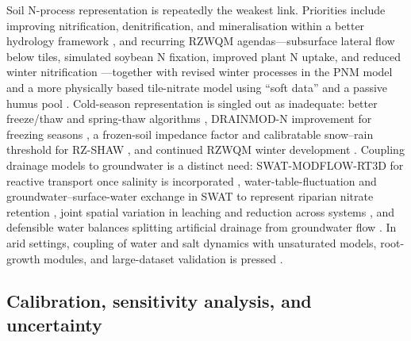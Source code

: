 \documentclass[11pt]{article}
\begin{document}
Soil N-process representation is repeatedly the weakest link. Priorities include
improving nitrification, denitrification, and mineralisation within a better
hydrology framework \parencite{Smith2020,Fang2012,Hu2007}, and recurring RZWQM
agendas---subsurface lateral flow below tiles, simulated soybean N fixation,
improved plant N uptake, and reduced winter nitrification
\parencite{Ma2007,Ma2008,Ma2001,Bakhsh2004}---together with revised winter
processes in the PNM model \parencite{Marjerison2016} and a more physically based
tile-nitrate model using ``soft data'' and a passive humus pool
\parencite{Qi2025}. Cold-season representation is singled out as inadequate:
better freeze/thaw and spring-thaw algorithms \parencite{Feyereisen2006b},
DRAINMOD-N improvement for freezing seasons \parencite{Yang2007,Saadat2020,Jiang2020},
a frozen-soil impedance factor and calibratable snow--rain threshold for RZ-SHAW
\parencite{Li2024b}, and continued RZWQM winter development
\parencite{Ahmed2007b,Motarjemi2021}. Coupling drainage models to groundwater is
a distinct need: SWAT-MODFLOW-RT3D for reactive transport once salinity is
incorporated \parencite{Addab2022}, water-table-fluctuation and
groundwater--surface-water exchange in SWAT to represent riparian nitrate
retention \parencite{Hoang2017}, joint spatial variation in leaching and
reduction across systems \parencite{Hojberg2017}, and defensible water balances
splitting artificial drainage from groundwater flow
\parencite{Barkle2021,Elsayed2023,Yang2008}. In arid settings, coupling of water
and salt dynamics with unsaturated models, root-growth modules, and
large-dataset validation is pressed
\parencite{Ebrahimian2015,Sarangi2006,Han2025,Liu2022,Guo2025}.

\subsection{Calibration, sensitivity analysis, and uncertainty}
\end{document}
